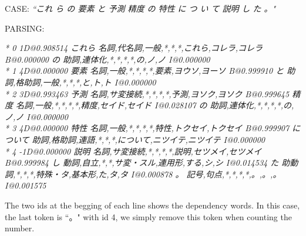 \documentclass[11pt,a4paper]{article}
\begin{document}
\begin{CJK*}{UTF8}{gbsn}
CASE: \emph{``これ ら の 要素 と 予測 精度 の 特性 に つ い て 説明 し た 。"}

PARSING:

\emph{* 0 1D@0.908514
これら  名詞,代名詞,一般,*,*,*,これら,コレラ,コレラ     B@0.000000
の      助詞,連体化,*,*,*,*,の,ノ,ノ    I@0.000000\\
* 1 4D@0.000000
要素    名詞,一般,*,*,*,*,要素,ヨウソ,ヨーソ    B@0.999910
と      助詞,格助詞,一般,*,*,*,と,ト,ト I@0.000000\\
* 2 3D@0.993463
予測    名詞,サ変接続,*,*,*,*,予測,ヨソク,ヨソク        B@0.999645
精度    名詞,一般,*,*,*,*,精度,セイド,セイド    I@0.028107
の      助詞,連体化,*,*,*,*,の,ノ,ノ    I@0.000000\\
* 3 4D@0.000000
特性    名詞,一般,*,*,*,*,特性,トクセイ,トクセイ        B@0.999907
について        助詞,格助詞,連語,*,*,*,について,ニツイテ,ニツイテ       I@0.000000\\
* 4 -1D@0.000000
説明    名詞,サ変接続,*,*,*,*,説明,セツメイ,セツメイ    B@0.999984
し      動詞,自立,*,*,サ変・スル,連用形,する,シ,シ      I@0.014534
た      助動詞,*,*,*,特殊・タ,基本形,た,タ,タ   I@0.000878
。      記号,句点,*,*,*,*,。,。,。      I@0.001575}

The two ids at the begging of each line shows the dependency words. In this case, the last token is ``。" with id 4, we simply remove this token when counting the number.
\end{CJK*}


\end{document}

